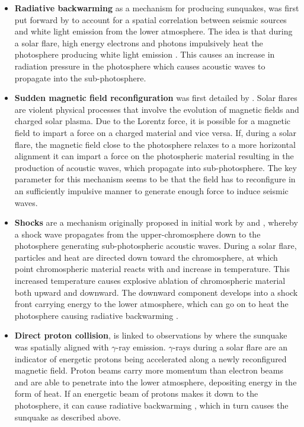\begin{itemize}
\item \textbf{Radiative backwarming} as a mechanism for producing sunquakes, was first put forward by \cite{2005ApJ...630.1168D} to account for a spatial correlation between seismic sources and white light emission from the lower atmosphere. The idea is that during a solar flare, high energy electrons and photons impulsively heat the photosphere producing white light emission \citep{1989SoPh..124..303M}. This causes an increase in radiation pressure in the photosphere which causes acoustic waves to propagate into the sub-photosphere. \\
     
\item \textbf{Sudden magnetic field reconfiguration} was first detailed by \cite{2008ASPC..383..221H}. Solar flares are violent physical processes that involve the evolution of magnetic fields and charged solar plasma. Due to the Lorentz force, it is possible for a magnetic field to impart a force on a charged material and vice versa. If, during a solar flare, the magnetic field close to the photosphere relaxes to a more horizontal alignment it can impart a force on the photospheric material resulting in the production of acoustic waves, which propagate into sub-photosphere. The key parameter for this mechanism seems to be that the field has to reconfigure in an sufficiently impulsive manner to generate enough force to induce seismic waves. \\

\item \textbf{Shocks} are a mechanism originally proposed in initial work by \cite{1995ESASP.376b.341K} and \cite{1998Natur.393..317K}, whereby a shock wave propagates from the upper-chromosphere down to the photosphere generating sub-photospheric acoustic waves. During a solar flare, particles and heat are directed down toward the chromosphere, at which point chromospheric material reacts with and increase in temperature. This increased temperature causes explosive ablation of chromospheric material both upward and downward. The downward component develops into a shock front carrying energy to the lower atmosphere, which can go on to heat the photosphere causing radiative backwarming \citep{1989SoPh..124..303M}. \\

\item \textbf{Direct proton collision}, is linked to observations by \cite{2007ApJ...664..573Z} where the sunquake was spatially aligned with $\gamma$-ray emission. $\gamma$-rays during a solar flare are an indicator of energetic protons being accelerated along a newly reconfigured magnetic field. Proton beams carry more momentum than electron beams and are able to penetrate into the lower atmosphere, depositing energy in the form of heat. If an energetic beam of protons makes it down to the photosphere, it can cause radiative backwarming \citep{1989SoPh..124..303M}, which in turn causes the sunquake as described above. \\

\end{itemize}

